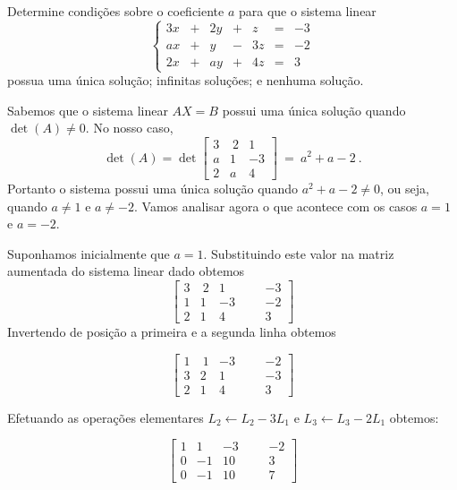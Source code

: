 \begin{problem}
Determine condições sobre o coeficiente $a$ para que o sistema linear
$$\left\{ \begin{array}{rrrrrrr}  3x & + & 2y & + &  z  &  =  &  -3 \\
                                  ax & + &  y & - & 3z  &  =  &  -2 \\
                                  2x & + & ay & + & 4z  &  =  &   3 \end{array}\right.$$
possua uma única solução; infinitas soluções; e nenhuma solução.
\end{problem}
\begin{solution}
Sabemos que o sistema linear $AX=B$ possui uma única solução quando $\det(A) \neq 0$. No nosso caso,
$$ \det(A) = \det\left[\begin{array}{rrr}
  3 &  \ 2 &   1  \\
  a &    1 &  -3  \\ 
  2 &    a &   4  \end{array}\right]\ =\ a^2+a-2\ . $$
Portanto o sistema possui uma única solução quando $a^2+a-2 \neq 0$, ou seja, quando $a\neq 1$ e $a\neq -2$.
Vamos analisar agora o que acontece com os casos $a=1$ e $a=-2$.

\medskip
Suponhamos inicialmente que $a=1$. Substituindo este valor na matriz aumentada do sistema linear dado obtemos
$$ \left[\begin{array}{rrrr|rr}
  3 &  \ 2 &    1 & & &   -3  \\
  1 &    1 &   -3 & & &   -2  \\ 
  2 &    1 &    4 & & &    3  \end{array}\right] $$
Invertendo de posição a primeira e a segunda linha obtemos

$$ \left[\begin{array}{rrrr|rr}
  1 &  \ 1 &   -3 & & &   -2  \\ 
  3 &    2 &    1 & & &   -3  \\
  2 &    1 &    4 & & &    3
\end{array}\right] $$

Efetuando as operações elementares $L_2 \leftarrow L_2 - 3L_1$ e $L_3 \leftarrow L_3 - 2L_1$ obtemos:

$$ \left[\begin{array}{rrrr|rr}
  1 &    1 &   -3 & & &   -2  \\ 
  0 &   -1 &   10 & & &    3  \\
  0 &   -1 &   10 & & &    7
\end{array}\right] $$


\end{solution}

